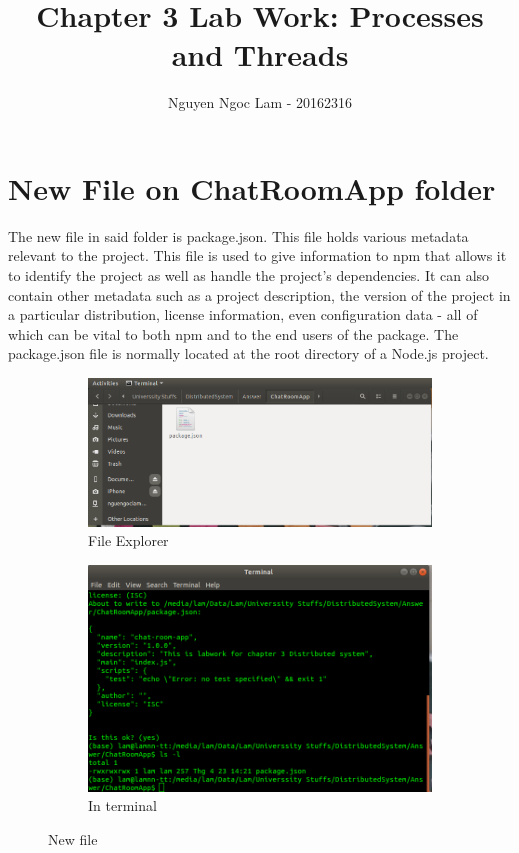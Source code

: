 \documentclass[11pt,a4paper]{article}
\title{Chapter 3 Lab Work: Processes and Threads}
\date{\displaydate{date}}
\author{Nguyen Ngoc Lam - 20162316}
\begin{document}
  	\maketitle
  	\newpage
  	\tableofcontents
  	\newpage
  	
  	\section{New File on ChatRoomApp folder}
  	The new file in said folder is package.json. This file holds various metadata relevant to the project. This file is used to give information to npm that allows it to identify the project as well as handle the project's dependencies. It can also contain other metadata such as a project description, the version of the project in a particular distribution, license information, even configuration data - all of which can be vital to both npm and to the end users of the package. The package.json file is normally located at the root directory of a Node.js project.
  	\begin{figure}[h!]
		\centering
  		\begin{subfigure}[b]{0.4\linewidth}
  		\includegraphics[width=\linewidth]{files-expl-chat.png}
    		\caption{File Explorer}
  		\end{subfigure}
  		\begin{subfigure}[b]{0.4\linewidth}
    		\includegraphics[width=\linewidth]{term-chat.png}
    		\caption{In terminal}
  		\end{subfigure}
  		\caption{New file}
  		\label{fig:pack}
	\end{figure}
	
\end{document}
